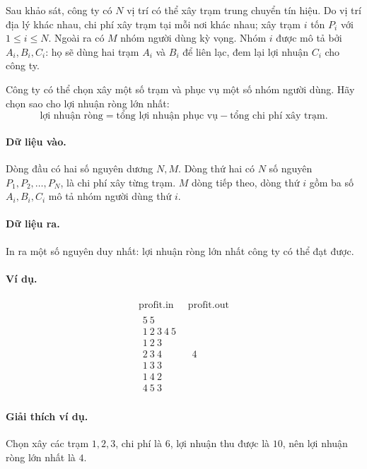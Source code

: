 \documentclass[11pt]{article}
\begin{document}
Sau khảo sát, công ty có \(N\) vị trí có thể xây trạm trung chuyển tín hiệu.
Do vị trí địa lý khác nhau, chi phí xây trạm tại mỗi nơi khác nhau; xây trạm
\(i\) tốn \(P_i\) với \(1\le i\le N\). Ngoài ra có \(M\) nhóm người dùng kỳ
vọng. Nhóm \(i\) được mô tả bởi \(A_i,B_i,C_i\): họ sẽ dùng hai trạm
\(A_i\) và \(B_i\) để liên lạc, đem lại lợi nhuận \(C_i\) cho công ty.

Công ty có thể chọn xây một số trạm và phục vụ một số nhóm người dùng. Hãy
chọn sao cho lợi nhuận ròng lớn nhất:
\[
  \text{lợi nhuận ròng}
  = \text{tổng lợi nhuận phục vụ} - \text{tổng chi phí xây trạm}.
\]

\paragraph{Dữ liệu vào.}
Dòng đầu có hai số nguyên dương \(N,M\). Dòng thứ hai có \(N\) số nguyên
\(P_1,P_2,\ldots,P_N\), là chi phí xây từng trạm. \(M\) dòng tiếp theo, dòng
thứ \(i\) gồm ba số \(A_i,B_i,C_i\) mô tả nhóm người dùng thứ \(i\).

\paragraph{Dữ liệu ra.}
In ra một số nguyên duy nhất: lợi nhuận ròng lớn nhất công ty có thể đạt được.

\paragraph{Ví dụ.}
\[
\begin{array}{c|c}
\text{profit.in} & \text{profit.out}\\
\hline
\begin{array}{l}
5\ 5\\
1\ 2\ 3\ 4\ 5\\
1\ 2\ 3\\
2\ 3\ 4\\
1\ 3\ 3\\
1\ 4\ 2\\
4\ 5\ 3
\end{array}
&
\begin{array}{l}
4
\end{array}
\end{array}
\]

\paragraph{Giải thích ví dụ.}
Chọn xây các trạm \(1,2,3\), chi phí là \(6\), lợi nhuận thu được là \(10\),
nên lợi nhuận ròng lớn nhất là \(4\).
\end{document}
